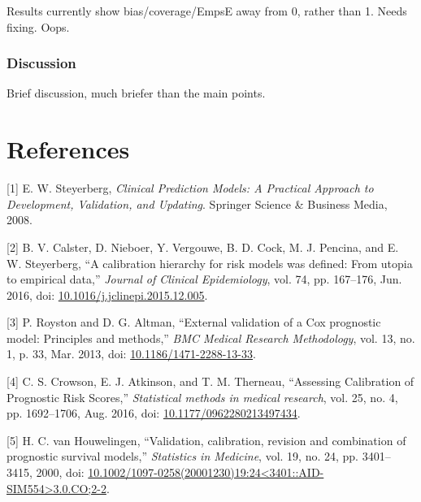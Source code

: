 \documentclass[
]{article}
\newenvironment{cslreferences}%
  {}%
  {\par}
\begin{document}
Results currently show bias/coverage/EmpsE away from 0, rather than 1. Needs fixing. Oops.

\hypertarget{discussion-2}{%
\subsubsection{Discussion}\label{discussion-2}}

Brief discussion, much briefer than the main points.

\hypertarget{references}{%
\section*{References}\label{references}}

\hypertarget{refs}{}
\begin{cslreferences}
\leavevmode\hypertarget{ref-steyerberg_clinical_2008}{}%
{[}1{]} E. W. Steyerberg, \emph{Clinical Prediction Models: A Practical Approach to Development, Validation, and Updating}. Springer Science \& Business Media, 2008.

\leavevmode\hypertarget{ref-calster_calibration_2016-1}{}%
{[}2{]} B. V. Calster, D. Nieboer, Y. Vergouwe, B. D. Cock, M. J. Pencina, and E. W. Steyerberg, ``A calibration hierarchy for risk models was defined: From utopia to empirical data,'' \emph{Journal of Clinical Epidemiology}, vol. 74, pp. 167--176, Jun. 2016, doi: \href{https://doi.org/10.1016/j.jclinepi.2015.12.005}{10.1016/j.jclinepi.2015.12.005}.

\leavevmode\hypertarget{ref-royston_external_2013}{}%
{[}3{]} P. Royston and D. G. Altman, ``External validation of a Cox prognostic model: Principles and methods,'' \emph{BMC Medical Research Methodology}, vol. 13, no. 1, p. 33, Mar. 2013, doi: \href{https://doi.org/10.1186/1471-2288-13-33}{10.1186/1471-2288-13-33}.

\leavevmode\hypertarget{ref-crowson_assessing_2016}{}%
{[}4{]} C. S. Crowson, E. J. Atkinson, and T. M. Therneau, ``Assessing Calibration of Prognostic Risk Scores,'' \emph{Statistical methods in medical research}, vol. 25, no. 4, pp. 1692--1706, Aug. 2016, doi: \href{https://doi.org/10.1177/0962280213497434}{10.1177/0962280213497434}.

\leavevmode\hypertarget{ref-houwelingen_validation_2000}{}%
{[}5{]} H. C. van Houwelingen, ``Validation, calibration, revision and combination of prognostic survival models,'' \emph{Statistics in Medicine}, vol. 19, no. 24, pp. 3401--3415, 2000, doi: \href{https://doi.org/10.1002/1097-0258(20001230)19:24\%3C3401::AID-SIM554\%3E3.0.CO;2-2}{10.1002/1097-0258(20001230)19:24\textless3401::AID-SIM554\textgreater3.0.CO;2-2}.


\end{cslreferences}
\end{document}
